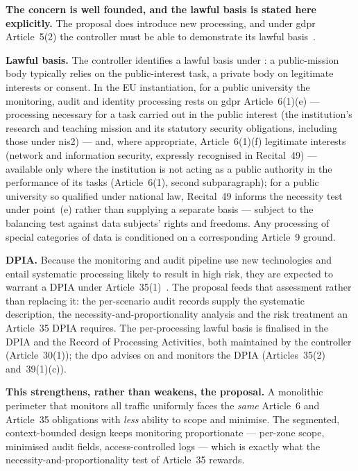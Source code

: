 \begin{answerbox}[Answer to Q8.3]
\textbf{The concern is well founded, and the lawful basis is stated here explicitly.} The proposal does introduce new processing, and under \gls{gdpr} Article~5(2) the controller must be able to demonstrate its lawful basis~\cite{gdpr}.

\medskip\noindent\textbf{Lawful basis.} The controller identifies a lawful basis under : a public-mission body typically relies on the public-interest task, a private body on legitimate interests or consent. In the EU instantiation, for a public university the monitoring, audit and identity processing rests on \gls{gdpr} Article~6(1)(e) --- processing necessary for a task carried out in the public interest (the institution's research and teaching mission and its statutory security obligations, including those under \gls{nis2}) --- and, where appropriate, Article~6(1)(f) legitimate interests (network and information security, expressly recognised in Recital~49) --- available only where the institution is not acting as a public authority in the performance of its tasks (Article~6(1), second subparagraph); for a public university so qualified under national law, Recital~49 informs the necessity test under point~(e) rather than supplying a separate basis --- subject to the balancing test against data subjects' rights and freedoms. Any processing of special categories of data is conditioned on a corresponding Article~9 ground.

\medskip\noindent\textbf{DPIA.} Because the monitoring and audit pipeline use new technologies and entail systematic processing likely to result in high risk, they are expected to warrant a DPIA under Article~35(1)~\cite{gdpr}. The proposal feeds that assessment rather than replacing it: the per-scenario audit records supply the systematic description, the necessity-and-proportionality analysis and the risk treatment an Article~35 DPIA requires. The per-processing lawful basis is finalised in the DPIA and the Record of Processing Activities, both maintained by the controller (Article~30(1)); the \gls{dpo} advises on and monitors the DPIA (Articles~35(2) and~39(1)(c)).

\medskip\noindent\textbf{This strengthens, rather than weakens, the proposal.} A monolithic perimeter that monitors all traffic uniformly faces the \emph{same} Article~6 and Article~35 obligations with \emph{less} ability to scope and minimise. The segmented, context-bounded design keeps monitoring proportionate --- per-zone scope, minimised audit fields, access-controlled logs --- which is exactly what the necessity-and-proportionality test of Article~35 rewards.
\end{answerbox}

